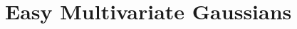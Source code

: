 \documentclass[12pt]{article}
\newcommand{\theAuthor}{Paul Virally}
\newcommand{\theTitle}{Multivariate Gaussians}
\newcommand{\theSubtitle}{}
\newcommand{\theDate}{\today}
\numberwithin{theorem}{section}
\numberwithin{equation}{section}
\numberwithin{figure}{section}
\begin{document}

\tableofcontents
\newpage

\section{Easy Multivariate Gaussians}
\end{document}
